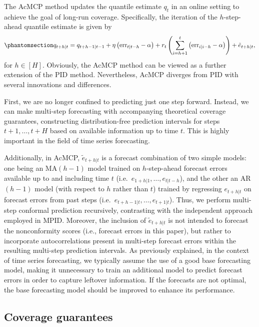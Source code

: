 \documentclass[
  11pt,
  a4paper,
]{article}
\theoremstyle{plain}
\theoremstyle{remark}
\begin{document}
The AcMCP method updates the quantile estimate \(q_t\) in an online
setting to achieve the goal of long-run coverage. Specifically, the
iteration of the \(h\)-step-ahead quantile estimate is given by
\begin{equation}\phantomsection\label{eq-acmcp}{
q_{t+h|t}=q_{t+h-1|t-1}+\eta \left(\mathrm{err}_{t|t-h}-\alpha\right)+r_t\left(\sum_{i=h+1}^t \left(\mathrm{err}_{i|i-h}-\alpha\right)\right)+\tilde{e}_{t+h|t},
}\end{equation} for \(h\in[H]\). Obviously, the AcMCP method can be
viewed as a further extension of the PID method. Nevertheless, AcMCP
diverges from PID with several innovations and differences.

First, we are no longer confined to predicting just one step forward.
Instead, we can make multi-step forecasting with accompanying
theoretical coverage guarantees, constructing distribution-free
prediction intervals for steps \(t+1,\ldots,t+H\) based on available
information up to time \(t\). This is highly important in the field of
time series forecasting.

Additionally, in AcMCP, \(\tilde{e}_{t+h|t}\) is a forecast combination
of two simple models: one being an MA\((h-1)\) model trained on
\(h\)-step-ahead forecast errors available up to and including time
\(t\) (i.e.~\(e_{1+h|1}, \ldots, e_{t|t-h}\)), and the other an
AR\((h-1)\) model (with respect to \(h\) rather than \(t\)) trained by
regressing \(e_{t+h|t}\) on forecast errors from past steps
(i.e.~\(e_{t+h-1|t}, \ldots, e_{t+1|t}\)). Thus, we perform multi-step
conformal prediction recursively, contrasting with the independent
approach employed in MPID. Moreover, the inclusion of
\(\tilde{e}_{t+h|t}\) is not intended to forecast the nonconformity
scores (i.e., forecast errors in this paper), but rather to incorporate
autocorrelations present in multi-step forecast errors within the
resulting multi-step prediction intervals. As previously explained, in
the context of time series forecasting, we typically assume the use of a
good base forecasting model, making it unnecessary to train an
additional model to predict forecast errors in order to capture leftover
information. If the forecasts are not optimal, the base forecasting
model should be improved to enhance its performance.

\subsection{Coverage guarantees}\label{coverage-guarantees}
\end{document}
